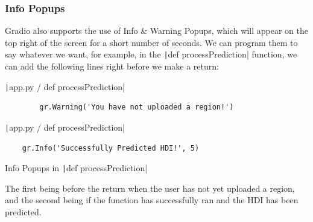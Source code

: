\documentclass[12pt]{report}
\newcommand{\pil}[1]{\protect\texttt|#1|}
\begin{document}
\begin{center}
\end{center}

\subsubsection{Info Popups}
Gradio also supports the use of Info \& Warning Popups, which will appear on the top right of the screen for a short number of seconds. We can program them to say whatever we want, for example, in the \pil{def processPrediction} function, we can add the following lines right before we make a return:

\begin{listing}[H]
\pil{app.py / def processPrediction}
\begin{verbatim}
        gr.Warning('You have not uploaded a region!')
\end{verbatim}
\pil{app.py / def processPrediction}
\begin{verbatim}
    gr.Info('Successfully Predicted HDI!', 5)
\end{verbatim}
\caption{Info Popups in \pil{def processPrediction}}\label{cs:infoPopups1}
\end{listing}

The first being before the return when the user has not yet uploaded a region, and the second being if the function has successfully ran and the HDI has been predicted.
\end{document}
